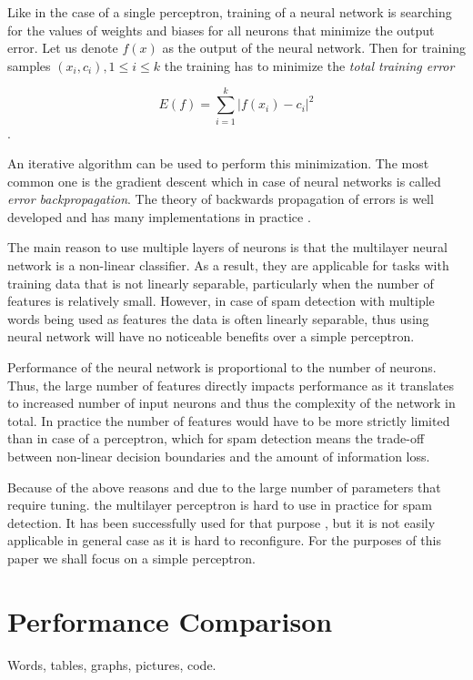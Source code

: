 \documentclass[12pt]{report}
\begin{document}
Like in the case of a single perceptron, training of a neural network is searching for the values of weights and biases for all neurons that minimize the output error. Let us denote $f(x)$ as the output of the neural network. Then for training samples $(x_i, c_i), 1 \leq i \leq k$ the training has to minimize the \textit{total training error}

$$E(f) = \sum_{i = 1}^{k}|f(x_i) - c_i|^2$$.

An iterative algorithm can be used to perform this minimization. The most common one is the gradient descent which in case of neural networks is called \textit{error backpropagation}. The theory of backwards propagation of errors is well developed and has many implementations in practice \cite{Haykin}.

The main reason to use multiple layers of neurons is that the multilayer neural network is a non-linear classifier. As a result, they are applicable for tasks with training data that is not linearly separable, particularly when the number of features is relatively small. However, in case of spam detection with multiple words being used as features the data is often linearly separable, thus using neural network will have no noticeable benefits over a simple perceptron.

Performance of the neural network is proportional to the number of neurons. Thus, the large number of features directly impacts performance as it translates to increased number of input neurons and thus the complexity of the network in total. In practice the number of features would have to be more strictly limited than in case of a perceptron, which for spam detection means the trade-off between non-linear decision boundaries and the amount of information loss.

Because of the above reasons and due to the large number of parameters that require tuning. the multilayer perceptron is hard to use in practice for spam detection. It has been successfully used for that purpose \cite{Tretyakov}, but it is not easily applicable in general case as it is hard to reconfigure. For the purposes of this paper we shall focus on a simple perceptron.

\newpage

\chapter{Performance Comparison}

Words, tables, graphs, pictures, code.
\end{document}

